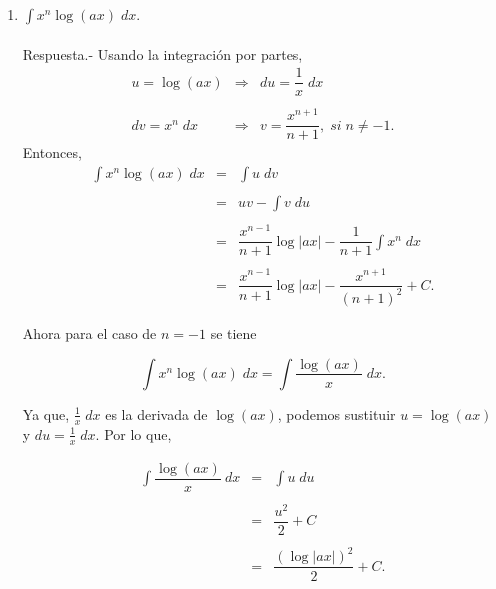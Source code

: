 \begin{enumerate}[\bfseries 1.]
    \item $\displaystyle\int x^n \log(ax)\; dx$.\\\\
	Respuesta.-\; Usando la integración por partes,
	$$
	\begin{array}{rcl}
	    u=\log(ax) &\Rightarrow& du=\dfrac{1}{x}\; dx\\\\
	    dv=x^n\; dx &\Rightarrow& v=\dfrac{x^{n+1}}{n+1}, \; si \; n\neq -1.
	\end{array}
	$$
	Entonces,
	$$
	\begin{array}{rcl}
	    \displaystyle\int x^n \log(ax)\; dx &=& \int u \; dv\\\\
						&=& uv-\displaystyle\int v\; du\\\\
						&=& \dfrac{x^{n-1}}{n+1}\log|ax| - \dfrac{1}{n+1}\displaystyle\int x^{n}\; dx\\\\
						&=& \dfrac{x^{n-1}}{n+1}\log|ax| - \dfrac{x^{n+1}}{(n+1)^2}+C.
	\end{array}
	$$

	Ahora para el caso de $n=-1$ se tiene

	$$\int x^n\log(ax)\; dx = \int \dfrac{\log(ax)}{x}\; dx.$$

	Ya que, $\frac{1}{x}\; dx$ es la derivada de $\log(ax)$, podemos sustituir $u=\log(ax)$ y $du=\frac{1}{x}\; dx$. Por lo que,

	$$
	\begin{array}{rcl}
	    \displaystyle\int \dfrac{\log(ax)}{x}\: dx &=& \displaystyle\int u\; du\\\\
						 &=& \dfrac{u^2}{2}+C\\\\
						 &=& \dfrac{(\log|ax|)^2}{2}+C.
	\end{array}
	$$
	\vspace{.5cm}



\end{enumerate}
